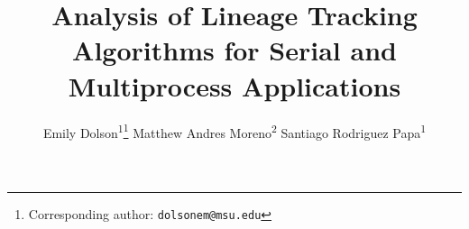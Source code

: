 \title{ Analysis of Lineage Tracking Algorithms for Serial and Multiprocess Applications }
\author{
    Emily Dolson\textsuperscript{1}\thanks{Corresponding author: \texttt{dolsonem@msu.edu}} \quad
    Matthew Andres Moreno\textsuperscript{2} \quad
    Santiago Rodriguez Papa\textsuperscript{1} \quad
}
\date{}

\newcommand{\affil}[1]{\textsuperscript{#1}}
\newcommand{\affiliations}{
    \affil{1} Michigan State University, East Lansing, United States \\
    \affil{2} University of Michigan, Ann Arbor, United States
}

\maketitle



